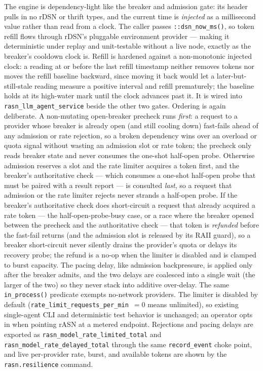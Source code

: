\documentclass[manuscript,screen,review]{acmart}
\newcommand{\rasn}{rASN\xspace}
\newcommand{\rdsn}{rDSN\xspace}
\begin{document}
The engine is dependency-light like the breaker and admission gate: its header
pulls in no \rdsn or thrift types, and the current time is \emph{injected} as a
millisecond value rather than read from a clock. The caller passes
\texttt{::dsn\_now\_ms()}, so token refill flows through \rdsn's pluggable
environment provider --- making it deterministic under replay and unit-testable
without a live node, exactly as the breaker's cooldown clock is. Refill is hardened
against a non-monotonic injected clock: a reading at or before the last refill
timestamp neither removes tokens nor moves the refill baseline backward, since
moving it back would let a later-but-still-stale reading measure a positive interval
and refill prematurely; the baseline holds at its high-water mark until the clock
advances past it. It is wired into
\texttt{rasn\_llm\_agent\_service} beside the other two gates. Ordering is again
deliberate. A non-mutating open-breaker precheck runs \emph{first}: a request to a
provider whose breaker is already open (and still cooling down) fast-fails ahead of
any admission or rate rejection, so a broken dependency wins over an overload or
quota signal without wasting an admission slot or rate token; the precheck only
reads breaker state and never consumes the one-shot half-open probe. Otherwise
admission reserves a slot and the rate limiter acquires a token first, and the
breaker's authoritative check --- which consumes a one-shot half-open probe that
must be paired with a result report --- is consulted \emph{last}, so a request that
admission or the rate limiter rejects never strands a half-open probe. If the
breaker's authoritative check does short-circuit a request that already acquired a
rate token --- the half-open-probe-busy case, or a race where the breaker opened
between the precheck and the authoritative check --- that token is \emph{refunded}
before the fast-fail returns (and the admission slot is released by its RAII guard),
so a breaker short-circuit never silently drains the provider's quota or delays its
recovery probe; the refund is a no-op when the limiter is disabled and is clamped to
burst capacity. The pacing
delay, like
admission backpressure, is applied only after the breaker admits, and the two
delays are coalesced into a single wait (the larger of the two) so they never
stack into additive over-delay. The same \texttt{in\_process()} predicate exempts
no-network providers. The limiter is disabled by default
(\texttt{rate\_limit\_requests\_per\_min}~$=0$ means unlimited), so existing
single-agent CLI and deterministic test behavior is unchanged; an operator opts in
when pointing \rasn at a metered endpoint. Rejections and pacing delays are
exported as \texttt{rasn\_model\_rate\_limited\_total} and
\texttt{rasn\_model\_rate\_delayed\_total} through the same \texttt{record\_event}
choke point, and live per-provider rate, burst, and available tokens are shown by
the \texttt{rasn.resilience} command.
\end{document}
